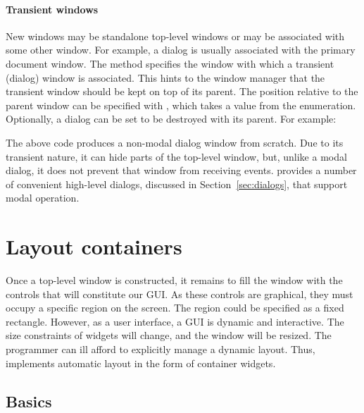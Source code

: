 \paragraph{Transient windows}
New windows may be standalone top-level windows or may be associated
with some other window. For example, a dialog is usually associated
with the primary document window. The
 method specifies the
window with which a transient (dialog) window is associated. This
hints to the window manager that the transient window should be kept on
top of its parent. The position relative to the parent window can be
specified with , which takes a value from the
 enumeration. Optionally, a dialog can be
set to be destroyed with its parent. For example:
\begin{Schunk}
\end{Schunk}
% 
The above code produces a non-modal dialog window from scratch. Due to
its transient nature, it can hide parts of the top-level window, but,
unlike a modal dialog, it does not prevent that window from receiving
events. \GTK\/ provides a number of convenient high-level dialogs,
discussed in Section~\ref{sec:dialogs}, that support modal operation.

\section{Layout containers}
\label{sec:RGtk2:layout}

Once a top-level window is constructed, it remains to fill the window
with the controls that will constitute our GUI. As these controls are
graphical, they must occupy a specific region on the screen. The
region could be specified as a fixed rectangle. However, as a
user interface, a GUI is dynamic and interactive. The size constraints
of widgets will change, and the window will be resized. The programmer
can ill afford to explicitly manage a dynamic layout. Thus, \GTK\/
implements automatic layout in the form of container widgets.

\subsection{Basics}
\label{sec:RGtk2:layout:basics}

